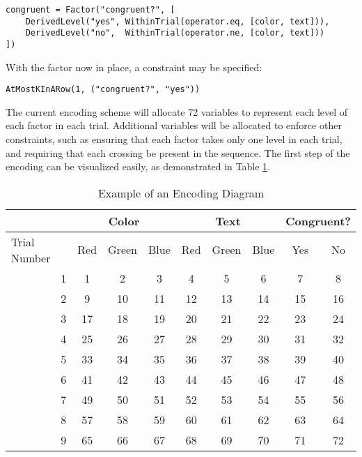 \begin{verbatim}
congruent = Factor("congruent?", [
    DerivedLevel("yes", WithinTrial(operator.eq, [color, text])),
    DerivedLevel("no",  WithinTrial(operator.ne, [color, text]))
])
\end{verbatim}

With the factor now in place, a constraint may be specified:

\begin{verbatim}
AtMostKInARow(1, ("congruent?", "yes"))
\end{verbatim}

The current encoding scheme will allocate 72 variables to represent each level of each factor in each trial. Additional variables will be allocated to enforce other constraints, such as ensuring that each factor takes only one level in each trial, and requiring that each crossing be present in the sequence. The first step of the encoding can be visualized easily, as demonstrated in Table \ref{tab:encoding_diagram}.

\begin{table}[t]
  \centering
  \caption{Example of an Encoding Diagram}
\begin{tabular}{|r|c|c|c|c|c|c|c|c|}
\hline
\multicolumn{1}{|l|}{}             & \multicolumn{3}{c|}{Color} & \multicolumn{3}{c|}{Text} & \multicolumn{2}{c|}{Congruent?} \\ \hline
\multicolumn{1}{|l|}{Trial Number} & Red    & Green    & Blue   & Red    & Green   & Blue   & Yes             & No            \\ \hline
1                                  & 1      & 2        & 3      & 4      & 5       & 6      & 7               & 8             \\ \hline
2                                  & 9      & 10       & 11     & 12     & 13      & 14     & 15              & 16            \\ \hline
3                                  & 17     & 18       & 19     & 20     & 21      & 22     & 23              & 24            \\ \hline
4                                  & 25     & 26       & 27     & 28     & 29      & 30     & 31              & 32            \\ \hline
5                                  & 33     & 34       & 35     & 36     & 37      & 38     & 39              & 40            \\ \hline
6                                  & 41     & 42       & 43     & 44     & 45      & 46     & 47              & 48            \\ \hline
7                                  & 49     & 50       & 51     & 52     & 53      & 54     & 55              & 56            \\ \hline
8                                  & 57     & 58       & 59     & 60     & 61      & 62     & 63              & 64            \\ \hline
9                                  & 65     & 66       & 67     & 68     & 69      & 70     & 71              & 72            \\ \hline
\end{tabular}
\label{tab:encoding_diagram}
\end{table}


